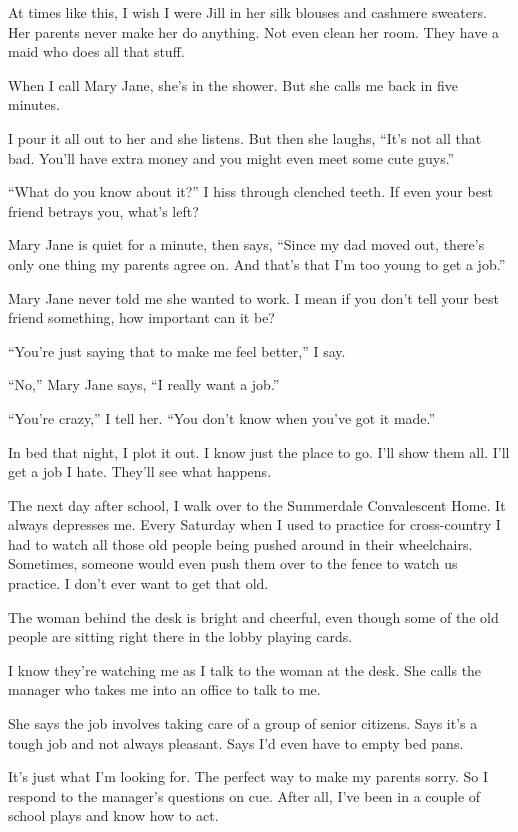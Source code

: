 \documentclass[
]{article}
\begin{document}
At times like this, I wish I were Jill in her silk blouses and cashmere
sweaters. Her parents never make her do anything. Not even clean her
room. They have a maid who does all that stuff.

When I call Mary Jane, she's in the shower. But she calls me back in
five minutes.

I pour it all out to her and she listens. But then she laughs, ``It's
not all that bad. You'll have extra money and you might even meet some
cute guys.''

``What do you know about it?'' I hiss through clenched teeth. If even
your best friend betrays you, what's left?

Mary Jane is quiet for a minute, then says, ``Since my dad moved out,
there's only one thing my parents agree on. And that's that I'm too
young to get a job.''

Mary Jane never told me she wanted to work. I mean if you don't tell
your best friend some­thing, how important can it be?

``You're just saying that to make me feel better,'' I say.

``No,'' Mary Jane says, ``I really want a job.''

``You're crazy,'' I tell her. ``You don't know when you've got it
made.''

In bed that night, I plot it out. I know just the place to go. I'll show
them all. I'll get a job I hate. They'll see what happens.

The next day after school, I walk over to the Summerdale Convalescent
Home. It always depresses me. Every Saturday when I used to practice for
cross-country I had to watch all those old people being pushed around in
their wheelchairs. Sometimes, someone would even push them over to the
fence to watch us practice. I don't ever want to get that old.

The woman behind the desk is bright and cheerful, even though some of
the old people are sitting right there in the lobby playing cards.

I know they're watching me as I talk to the woman at the desk. She calls
the manager who takes me into an office to talk to me.

She says the job involves taking care of a group of senior citizens.
Says it's a tough job and not always pleasant. Says I'd even have to
empty bed pans.

It's just what I'm looking for. The perfect way to make my parents
sorry. So I respond to the manager's questions on cue. After all, I've
been in a couple of school plays and know how to act.
\end{document}

